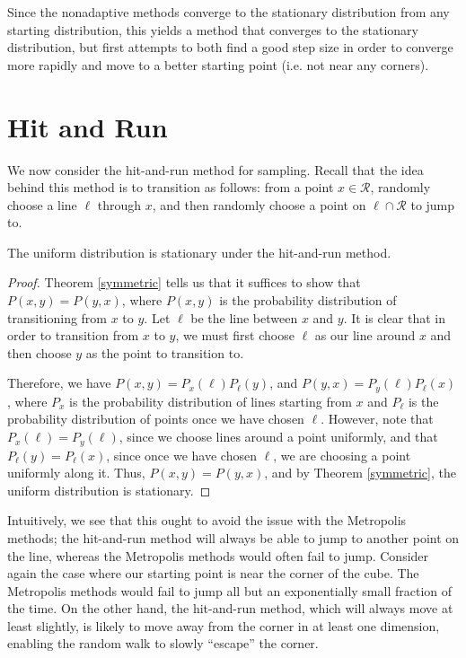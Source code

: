 \documentclass[11pt]{article}
\begin{document}
Since the nonadaptive methods converge to the stationary distribution from any starting distribution, this yields a method that converges to the stationary distribution, but first attempts to both find a good step size in order to converge more rapidly and move to a better starting point (i.e. not near any corners).

\section{Hit and Run}

We now consider the hit-and-run method for sampling. Recall that the idea behind this method is to transition as follows: from a point $x \in \mathcal{R}$, randomly choose a line $\ell$ through $x$, and then randomly choose a point on $\ell \cap \mathcal{R}$ to jump to.

\begin{prop}
The uniform distribution is stationary under the hit-and-run method.
\end{prop}
\begin{proof}
Theorem \ref{symmetric} tells us that it suffices to show that $P(x,y) = P(y,x)$, where $P(x,y)$ is the probability distribution of transitioning from $x$ to $y$. Let $\ell$ be the line between $x$ and $y$. It is clear that in order to transition from $x$ to $y$, we must first choose $\ell$ as our line around $x$ and then choose $y$ as the point to transition to. 

Therefore, we have $P(x,y) = P_x(\ell)P_\ell(y)$, and $P(y,x) = P_y(\ell)P_\ell(x)$, where $P_x$ is the probability distribution of lines starting from $x$ and $P_\ell$ is the probability distribution of points once we have chosen $\ell$. However, note that $P_x(\ell) = P_y(\ell)$, since we choose lines around a point uniformly, and that $P_\ell(y) = P_\ell(x)$, since once we have chosen $\ell$, we are choosing a point uniformly along it. Thus, $P(x,y) = P(y,x)$, and by Theorem \ref{symmetric}, the uniform distribution is stationary.
\end{proof}

Intuitively, we see that this ought to avoid the issue with the Metropolis methods; the hit-and-run method will always be able to jump to another point on the line, whereas the Metropolis methods would often fail to jump. Consider again the case where our starting point is near the corner of the cube. The Metropolis methods would fail to jump all but an exponentially small fraction of the time. On the other hand, the hit-and-run method, which will always move at least slightly, is likely to move away from the corner in at least one dimension, enabling the random walk to slowly ``escape'' the corner.
\end{document}
